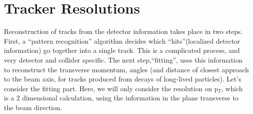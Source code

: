\section{Tracker Resolutions}
Reconstruction of tracks from the detector information takes place in two steps. First, a ``pattern recognition'' algorithm decides which ``hits''(localized detector information) go together into a single track. This is a complicated process, and very detector and collider specific. The next step,``fitting'', uses this information to reconstruct the transverse momentum, angles (and distance of closest approach to the beam axis, for tracks produced from decays of long-lived particles).  
Let's consider the fitting part.  Here, we will only consider the resolution on p$_{T}$, which is a 2 dimensional calculation, using the information in the plane transverse to the beam direction.   

